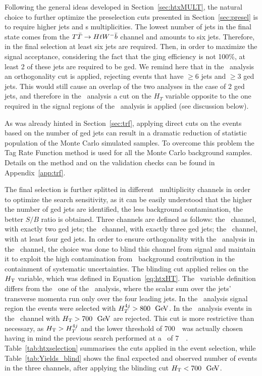 Following the general ideas developed in Section~\ref{sec:htxMULT}, the
natural choice to further optimize the preselection cuts presented in 
Section~\ref{sec:presel} is to require higher jets and \bjet s multiplicities.
The lowest number of jets in the final state comes from the $\TTbar\to HtW^-\bar{b}$
channel and amounts to six jets. Therefore, in the final selection at least 
six jets are required.
Then, in order to maximize the signal acceptance, considering the fact that the
\btag ging efficiency is not 100\%, at least 2 of these jets are
required to be \btag ged.
We remind here that in the \wbx\ analysis an orthogonality
cut is applied, rejecting events that have $\geq 6$ jets and $\geq 3$
\btag ged jets. This would still cause an overlap of the two analyses
in the case of 2 \btag ged jets, and therefore in the \htx\ analysis
a cut on the $H_T$ variable opposite to the one required in the 
signal regions of the \wbx\ analysis is applied (see discussion below).  

As was already hinted in Section~\ref{sec:trf}, 
applying direct cuts on the events based on the number of \btag ged jets
can result in a dramatic reduction of statistic population of the Monte
Carlo simulated samples. To overcome this problem the Tag Rate Function
method is used for all the Monte Carlo background samples. Details on
the method and on the validation checks can be found in Appendix~\ref{app:trf}.

The final selection is further splitted in different \bjet\ multiplicity 
channels in order to optimize the search sensitivity, as it can be
easily understood that the higher the number of \btag ged jets are
identified, the less background contamination, 
the better $S/B$ ratio is obtained. Three channels are
defined as follows: the \chii\ channel, with exactly two \btag ged jets;
the \chiii\ channel, with exactly three \btag ged jets;
the \chiv\ channel, with at least four \btag ged jets.
In order to ensure orthogonality with the \wbx\ analysis
in the \chii\ channel, the choice was done to blind this channel
from signal and maintain it to exploit the high contamination from
\ttbar\ background contribution in the containment of systematic
uncertainties. The blinding cut applied relies on the $\HT$ variable,
which was defined in Equation~\ref{eq:htxHT}.
The \HT\ variable definition differs from the \htfj\ one of the \wbx\ analysis,
where the scalar sum over the jets' transverse momenta run only
over the four leading jets. In the \wbx\ analysis signal region the 
events were selected with $\htfj > 800~\gev$. In the \htx\ 
analysis events in the \chii\ channel with $\HT > 700~\gev$
are rejected. This cut is more restrictive than necessary, as $\HT>\htfj$
and the lower threshold of 700~\gev\ was actually chosen having in mind
the previous search performed at a \cme\ of 7~\tev~\cite{ATLAS:2012qe}.
Table~\ref{tab:htxselection} summarises the cuts applied in the event selection,
while Table~\ref{tab:Yields_blind} shows the final expected and
observed number of events in the three channels, after applying 
the blinding cut $\HT < 700~\gev$.

